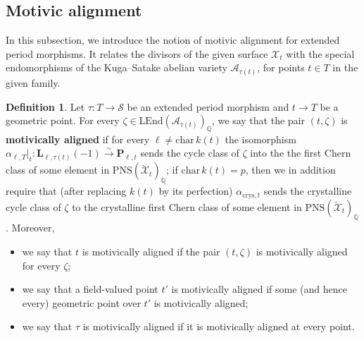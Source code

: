 \documentclass[11pt, letterpaper]{amsart}
\theoremstyle{plain}
\theoremstyle{definition}
\newtheorem{definition}[theorem]{Definition}
\newcommand{\IQ}{\mathbb{Q}}
\newcommand{\<}{\langle}
\renewcommand{\>}{\rangle}
\newcommand{\shS}{\mathscr{S}}
\newcommand{\sA}{\mathcal{A}}
\newcommand{\sX}{\mathcal{X}}
\newcommand{\bL}{\mathbf{L}}
\newcommand{\LEnd}{\mathrm{LEnd}}
\newcommand{\crys}{\mathrm{crys}}
\newcommand{\PNS}{\mathrm{PNS}}
\newcommand{\bP}{\mathbf{P}}
\newcommand{\sto}{\stackrel{\sim}{\to}}
\begin{document}
\subsection{Motivic alignment}
\label{sub: mot_align}
In this subsection, we introduce the notion of motivic alignment for extended period morphisms.
It relates the divisors of the given surface $\sX_t$ with the special endomorphisms of the Kuga--Satake abelian variety $\sA_{\tau(t)}$, for points $t\in T$ in the given family.
\begin{definition}
\label{def: motivically aligned}
    Let $\tau : T \to \shS$ be an extended period morphism and $t \to T$ be a geometric point. For every $\zeta \in \LEnd(\sA_{\tau(t)})_\IQ$, we say that the pair $(t, \zeta)$ is \textbf{motivically aligned} if for every $\ell \neq \mathrm{char\,}k(t)$ the isomorphism $\alpha_{\ell, T}|_t :   \bL_{\ell, \tau(t)}(-1) \sto \bP_{\ell, t}$ sends the cycle class of $\zeta$ into the the first Chern class of some element in $\PNS(\breve{\sX}_t)_\IQ$; if $\mathrm{char\,}k(t) = p$, then we in addition require that (after replacing $k(t)$ by its perfection) $\alpha_{\crys, t}$ sends the crystalline cycle class of $\zeta$ to the crystalline first Chern class of some element in $\PNS(\breve{\sX}_t)_\IQ$. 
    Moreover, 
    \begin{itemize}
        \item we say that $t$ is motivically aligned if the pair $(t, \zeta)$ is motivically aligned for every $\zeta$; 
        \item we say that a field-valued point $t'$ is  motivically aligned if some (and hence every) geometric point over $t'$ is motivically aligned;
        \item we say that $\tau$ is motivically aligned if it is motivically aligned at every point. 
    \end{itemize}
\end{definition}
\end{document}
